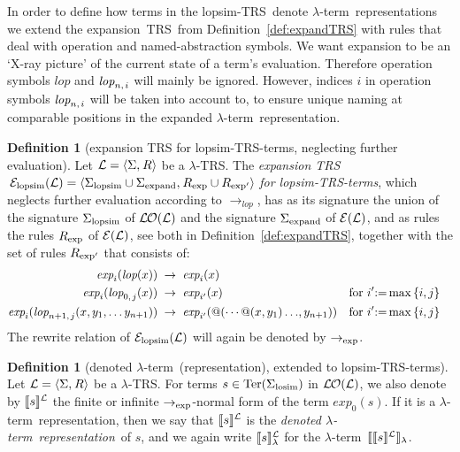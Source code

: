\documentclass[
submission
]{dmtcs-episciences-tampered}
\makeatletter
\newcommand{\fap}[2]{#1({#2})}
\newcommand{\bfap}[3]{{#1}({#2},\hspace*{0.05pt}{#3})}
\newcommand{\indap}[2]{#1 _{#2}}
\newcommand{\supap}[2]{#1 ^{#2}}
\newcommand{\pap}{\supap}
\newcommand{\nb}{\nobreakdash}
\newcommand{\nf}{\normalfont}
\newcommand{\sdefdby}{{:=}}
\newcommand{\tuple}[1]{\langle #1 \rangle}
\newcommand{\tuplespace}{\hspace*{0.5pt}}
\newcommand{\pair}[2]{\tuple{#1, \tuplespace #2}}
\newcommand{\setexp}[1]{\left\{{#1}\right\}}
\newcommand{\avar}{x}
\newcommand{\bvar}{y}
\newcommand{\bvari}{\indap{\bvar}}
\newcommand{\ater}{s}
\newcommand{\asig}{\Sigma}
\newcommand{\asiglosim}{\indap{\asig}{\scriptlosim}}
\newcommand{\asiglopsim}{\indap{\asig}{\scriptlopsim}}
\newcommand{\asigexpand}{\indap{\asig}{\scriptexpand}}
\newcommand{\arules}{R}
\newcommand{\rulesexp}{\indap{\arules}{\scriptexp}}
\newcommand{\rulesexpprime}{\indap{\arules}{\scriptexp'}}
\newcommand{\alTRS}{{\cal L}}
\newcommand{\TRS}{TRS}
\newcommand{\stermsover}{\text{\nf Ter}}
\newcommand{\termsover}{\fap{\stermsover}}
\newcommand{\sfolapp}{@}
\newcommand{\folapp}{\bfap{\sfolapp}}
\newcommand{\slop}{\textit{lop}}\newcommand{\slopstar}{\pap{\slop}{*}}
\newcommand{\lopstart}{\fap{\slop}}
\newcommand{\slopni}[2]{\slop_{#1,\hspace*{1pt}#2}}
\newcommand{\lopni}[2]{\fap{\slopni{#1}{#2}}}
\newcommand{\sexpandTRS}{{\cal E}}
\newcommand{\sexpandTRSlopsim}{\indap{\sexpandTRS}{\scriptlopsim}}
\newcommand{\expandTRSwrt}{\fap{\sexpandTRS}}
\newcommand{\expandTRSlopsimwrt}{\fap{\sexpandTRSlopsim}}
\newcommand{\denlterrepwrt}[2]{\llbracket{#2}\rrbracket^{#1}}
\newcommand{\denlterwrt}[2]{\llbracket{#2}\rrbracket^{#1}_{\sslabs}}
\newcommand{\denlter}[1]{\llbracket{#1}\rrbracket_{\sslabs}}
\newcommand{\lopsimTRS}{lopsim-TRS}
\newcommand{\sslabs}{\lambda}
\newcommand{\sred}{\to}
\newcommand{\red}{\mathrel{\sred}}
\newcommand{\sredi}{\indap{\sred}}
\newcommand{\scriptlosim}{\text{\nf losim}}
\newcommand{\scriptlopsim}{\text{\nf lopsim}}
\newcommand{\scriptexpand}{\text{\nf expand}}
\newcommand{\scriptexp}{\text{\nf exp}}
\newcommand{\slopsimred}{\sredi{\slop}}
\newcommand{\sexpand}{\textit{exp}}
\newcommand{\sexpandi}{\indap{\sexpand}}
\newcommand{\expandi}[1]{\fap{\sexpandi{#1}}}
\newcommand{\sexpred}{\sredi{\scriptexp}}
\newcommand{\lambdaterm}{$\lambda$\nb-term}
\newcommand{\lTRS}{$\lambda$\hspace*{-0.5pt}\nb-\hspace*{-0.5pt}\TRS}
\theoremstyle{plain}
\theoremstyle{definition}
\newtheorem{definition}[theorem]{Definition}
\makeatother
\begin{document}
In order to define how terms in the \lopsimTRS\ denote \lambdaterm\ representations
we extend the expansion~\TRS\ from Definition~\ref{def:expandTRS} with rules
that deal with operation and named-abstraction symbols. 
We want expansion to be an `X-ray picture' of the current state of a term's evaluation. 
Therefore operation symbols $\slop$ and $\slopni{n}{i}$ will mainly be ignored.
However, indices $i$ in operation symbols $\slopni{n}{i}$ will be taken into account to,
to ensure unique naming at comparable positions in the expanded \lambdaterm\ representation.


\begin{definition}[expansion TRS for \lopsimTRS-terms, neglecting further evaluation]\label{def:expandTRS:for:losimTRS}
  Let $\alTRS = \pair{\asig}{\arules}$ be a \lTRS. 
The \emph{expansion \TRS} $\,\expandTRSlopsimwrt{\alTRS} = \pair{\asiglopsim \cup \asigexpand}{\rulesexp \cup \rulesexpprime}$ \emph{for \lopsimTRS-terms},
  which neglects further evaluation according to $\slopsimred$,
  has as its signature the union of the signature $\asiglopsim$ of $\lopsimTRSwrt{\alTRS}$ 
  and the signature $\asigexpand$ of $\expandTRSwrt{\alTRS}$,
  and as rules the rules $\rulesexp$ of $\expandTRSwrt{\alTRS}$,
  see both in Definition~\ref{def:expandTRS}, together with
  the set of rules $\rulesexpprime$ that consists of:
\begin{align*}    
\expandi{i}{\lopstart{\avar}}
      & \;\red\;
    \expandi{i}{\avar}
    \\
    \expandi{i}{\lopni{0}{j}{\avar}}
      & \;\red\;  
\expandi{i'}{\avar}
    & & \text{for $i' \sdefdby \max\setexp{i,j}$} 
    \\
    \expandi{i}{\lopni{n+1}{j}{\avar,\bvari{1},\ldots\bvari{n+1}}} 
    & \;\red\;
    \expandi{i'}{\folapp{\cdots\folapp{\avar}{\bvari{1}}\ldots}{\bvari{n+1}}}
& & \text{for $i' \sdefdby \max\setexp{i,j}$} 
  \end{align*}
  The rewrite relation of $\expandTRSlopsimwrt{\alTRS}$ will again be denoted by $\sexpred$.
\end{definition}


\begin{definition}[denoted \lambdaterm\ (representation), extended to \lopsimTRS-terms]
  Let $\alTRS = \pair{\asig}{\arules}$ be a \lTRS. 
  For terms $\ater\in\termsover{\asiglosim}$ in $\lopsimTRSwrt{\alTRS}$,  we also denote by $\denlterrepwrt{\alTRS}{\ater}$ 
  the finite or infinite $\sexpred$\nb-normal form of the term $\expandi{0}{\ater}$.
  If it is a \lambdaterm\ representation, then we say that $\denlterrepwrt{\alTRS}{\ater}$ is
  the \emph{denoted \lambdaterm\ representation}~of $\ater$,
  and we again write $\denlterwrt{\alTRS}{\ater}$ for the \lambdaterm~$\denlter{\denlterrepwrt{\alTRS}{\ater}}$.
\end{definition}
\end{document}
